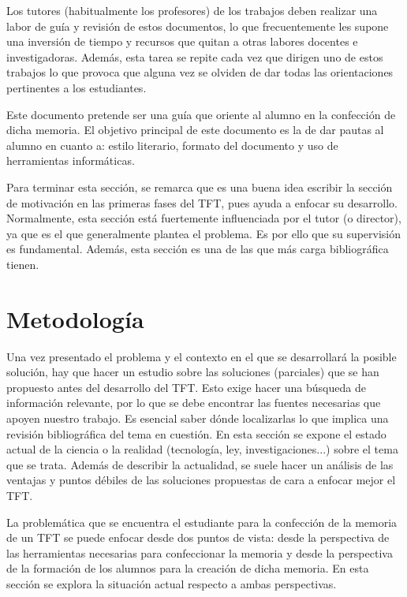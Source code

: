 \documentclass[12pt,spanish,chapterprefix, numbers=noenddot]{book}
\numberwithin{equation}{section}
\numberwithin{figure}{section}
\begin{document}
    Los tutores (habitualmente los profesores) de los trabajos deben realizar
    una labor de guía y revisión de estos documentos, lo que frecuentemente
    les supone una inversión de tiempo y recursos que quitan a otras labores
    docentes e investigadoras. Además, esta tarea se repite cada vez que
    dirigen uno de estos trabajos lo que provoca que alguna vez se olviden
    de dar todas las orientaciones pertinentes a los estudiantes.

    Este documento pretende ser una guía que oriente al alumno en la confección
    de dicha memoria. El objetivo principal de este documento es la de
    dar pautas al alumno en cuanto a: estilo literario, formato del documento
    y uso de herramientas informáticas.

    Para terminar esta sección, se remarca que es una buena idea escribir
    la sección de motivación en las primeras fases del TFT, pues ayuda
    a enfocar su desarrollo. Normalmente, esta sección está fuertemente
    influenciada por el tutor (o director), ya que es el que generalmente
    plantea el problema. Es por ello que su supervisión es fundamental.
    Además, esta sección es una de las que más carga bibliográfica tienen.

    \section{Metodología}

    Una vez presentado el problema y el contexto en el que se desarrollará
    la posible solución, hay que hacer un estudio sobre las soluciones
    (parciales) que se han propuesto antes del desarrollo del TFT. Esto
    exige hacer una búsqueda de información relevante, por lo que se debe
    encontrar las fuentes necesarias que apoyen nuestro trabajo. Es esencial
    saber dónde localizarlas lo que implica una revisión bibliográfica
    del tema en cuestión. En esta sección se expone el estado actual de
    la ciencia o la realidad (tecnología, ley, investigaciones...) sobre
    el tema que se trata. Además de describir la actualidad, se suele
    hacer un análisis de las ventajas y puntos débiles de las soluciones
    propuestas de cara a enfocar mejor el TFT.

    La problemática que se encuentra el estudiante para la confección
    de la memoria de un TFT se puede enfocar desde dos puntos de vista:
    desde la perspectiva de las herramientas necesarias para confeccionar
    la memoria y desde la perspectiva de la formación de los alumnos para
    la creación de dicha memoria. En esta sección se explora la situación
    actual respecto a ambas perspectivas.
\end{document}
